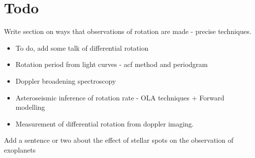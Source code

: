 \section{Todo}
Write section on ways that observations of rotation are made - precise techniques.
\begin{itemize}
    \item To do, add some talk of differential rotation
    \item Rotation period from light curves - acf method and periodgram
    \item Doppler broadening spectroscopy
    \item Asteroseismic inference of rotation rate - OLA techniques + Forward modelling
    \item Measurement of differential rotation from doppler imaging.
\end{itemize}

Add a sentence or two about the effect of stellar spots on the observation of exoplanets

% 

